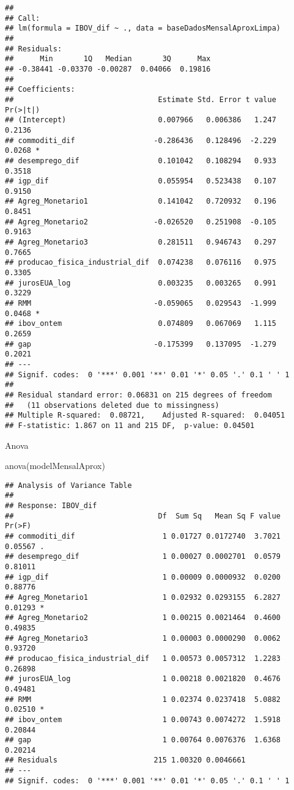 \documentclass[
]{article}
\newenvironment{Shaded}{\begin{snugshade}}{\end{snugshade}}
\newcommand{\FunctionTok}[1]{\textcolor[rgb]{0.00,0.00,0.00}{#1}}
\newcommand{\NormalTok}[1]{#1}
\begin{document}
\begin{verbatim}
## 
## Call:
## lm(formula = IBOV_dif ~ ., data = baseDadosMensalAproxLimpa)
## 
## Residuals:
##      Min       1Q   Median       3Q      Max 
## -0.38441 -0.03370 -0.00287  0.04066  0.19816 
## 
## Coefficients:
##                                 Estimate Std. Error t value Pr(>|t|)  
## (Intercept)                     0.007966   0.006386   1.247   0.2136  
## commoditi_dif                  -0.286436   0.128496  -2.229   0.0268 *
## desemprego_dif                  0.101042   0.108294   0.933   0.3518  
## igp_dif                         0.055954   0.523438   0.107   0.9150  
## Agreg_Monetario1                0.141042   0.720932   0.196   0.8451  
## Agreg_Monetario2               -0.026520   0.251908  -0.105   0.9163  
## Agreg_Monetario3                0.281511   0.946743   0.297   0.7665  
## producao_fisica_industrial_dif  0.074238   0.076116   0.975   0.3305  
## jurosEUA_log                    0.003235   0.003265   0.991   0.3229  
## RMM                            -0.059065   0.029543  -1.999   0.0468 *
## ibov_ontem                      0.074809   0.067069   1.115   0.2659  
## gap                            -0.175399   0.137095  -1.279   0.2021  
## ---
## Signif. codes:  0 '***' 0.001 '**' 0.01 '*' 0.05 '.' 0.1 ' ' 1
## 
## Residual standard error: 0.06831 on 215 degrees of freedom
##   (11 observations deleted due to missingness)
## Multiple R-squared:  0.08721,    Adjusted R-squared:  0.04051 
## F-statistic: 1.867 on 11 and 215 DF,  p-value: 0.04501
\end{verbatim}

Anova

\begin{Shaded}
\begin{Highlighting}[]
\FunctionTok{anova}\NormalTok{(modelMensalAprox)}
\end{Highlighting}
\end{Shaded}

\begin{verbatim}
## Analysis of Variance Table
## 
## Response: IBOV_dif
##                                 Df  Sum Sq   Mean Sq F value  Pr(>F)  
## commoditi_dif                    1 0.01727 0.0172740  3.7021 0.05567 .
## desemprego_dif                   1 0.00027 0.0002701  0.0579 0.81011  
## igp_dif                          1 0.00009 0.0000932  0.0200 0.88776  
## Agreg_Monetario1                 1 0.02932 0.0293155  6.2827 0.01293 *
## Agreg_Monetario2                 1 0.00215 0.0021464  0.4600 0.49835  
## Agreg_Monetario3                 1 0.00003 0.0000290  0.0062 0.93720  
## producao_fisica_industrial_dif   1 0.00573 0.0057312  1.2283 0.26898  
## jurosEUA_log                     1 0.00218 0.0021820  0.4676 0.49481  
## RMM                              1 0.02374 0.0237418  5.0882 0.02510 *
## ibov_ontem                       1 0.00743 0.0074272  1.5918 0.20844  
## gap                              1 0.00764 0.0076376  1.6368 0.20214  
## Residuals                      215 1.00320 0.0046661                  
## ---
## Signif. codes:  0 '***' 0.001 '**' 0.01 '*' 0.05 '.' 0.1 ' ' 1
\end{verbatim}
\end{document}
